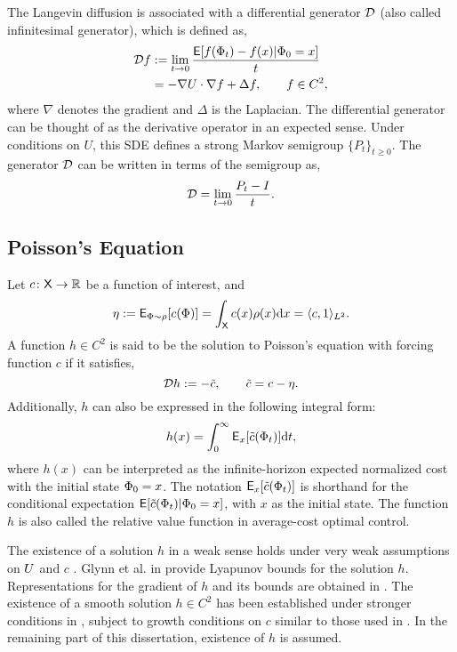 The Langevin diffusion is associated with a differential generator ${\cal D}$ (also called infinitesimal generator), which is defined as,
\begin{equation}
\begin{aligned}
\generate f &:= \lim_{t \to 0} \frac{\Expect [ f(\markovstate_t) - f(x) | \markovstate_0 = x]}{t} \\
& = -\nabla \pot \cdot \nabla f + \Delta f,\qquad f\in C^2,
\label{e:langevin_generator}
\end{aligned}
\end{equation}
where $\nabla$ denotes the gradient and $\Delta$ is the Laplacian. The differential generator can be thought of as the derivative operator in an expected sense. Under conditions on $U$, this SDE defines a strong Markov semigroup $\{P_t\}_{t \geq 0}$. The generator ${\cal D}$ can be written in terms of the semigroup as,
\begin{equation}
{\cal D} = \lim_{t \to 0} \frac{P_t - I}{t}.
\end{equation}

\subsection{Poisson's Equation}
Let $c \colon {\sf X} \to \mathbb{R}$ be a function of interest, and 
\begin{equation}
\eta := {\sf E}_{\Phi \sim \rho}[c(\Phi)] =  \int_{\sf X} c(x) \rho(x) \text{d} x = \langle c, 1 \rangle_{L^2}.
\end{equation}
A function $h\in C^2$ is said to be the solution to Poisson's equation with forcing function $c$ if it satisfies,
\begin{equation}
\generate h := - \tilc, \qquad  \tilc = c - \eta.
\label{e:poissons}
\end{equation}
Additionally, $h$ can also be expressed in the following integral form:
\begin{equation}
h(x) =\int_0^\infty {\sf E}_x[\tilde c(\Phi_t)] \text{d} t,
\end{equation}
where $h(x)$ can be interpreted as the infinite-horizon expected normalized cost with the initial state $\Phi_0 = x$. The notation ${\sf E}_x[\tilde c(\Phi_t)]$ is shorthand for the conditional expectation ${\sf E}[\tilde c(\Phi_t)|\Phi_0 = x]$, with $x$ as the initial state. The function $h$ is also called the relative value function in average-cost optimal control.  

The existence of a solution $h$ in a weak sense holds under very weak assumptions on $U$ and $c$  \cite{glymey96a,konmey12a}.  Glynn et al. in \cite{glymey96a} provide Lyapunov bounds for the solution $h$.  Representations for the gradient of $h$ and its bounds are obtained in \cite{laumehmeyrag15,devkonmey17b}.   The existence of  a  smooth solution $h\in C^2$ has been established under stronger conditions in \cite{parver01}, subject to growth conditions on $c$ similar to those used in  \cite{glymey96a}. In the remaining part of this dissertation, existence of $h$ is assumed. 

